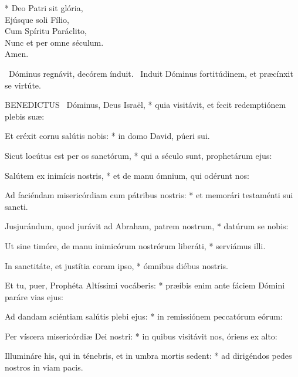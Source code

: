 * Deo Patri sit glória,\\
Ejúsque soli Fílio,\\
Cum Spíritu Paráclito,\\
Nunc et per omne séculum.\\
Amen.

\V\ Dóminus regnávit, decórem índuit. \R\ Induit Dóminus fortitúdinem, et præcínxit se virtúte.



\lettrine[lines=2]{B}{ENEDICTUS} \textdagger\ Dóminus, Deus Israël, * quia visitávit, et fecit redemptiónem plebis suæ:

Et eréxit cornu salútis nobis: * in domo David, púeri sui.

Sicut locútus est per os sanctórum, * qui a século sunt, prophetárum ejus:

Salútem ex inimícis nostris, * et de manu ómnium, qui odérunt nos:

Ad faciéndam misericórdiam cum pátribus nostris: * et memorári testaménti sui sancti.

Jusjurándum, quod jurávit ad Abraham, patrem nostrum, * datúrum se nobis:

Ut sine timóre, de manu inimicórum nostrórum liberáti, * serviámus illi.

In sanctitáte, et justítia coram ipso, * ómnibus diébus nostris.

Et tu, puer, Prophéta Altíssimi vocáberis: * præíbis enim ante fáciem Dómini paráre vias ejus:

Ad dandam sciéntiam salútis plebi ejus: * in remissiónem peccatórum eórum:

Per víscera misericórdiæ Dei nostri: * in quibus visitávit nos, óriens ex alto:

Illumináre his, qui in ténebris, et in umbra mortis sedent: * ad dirigéndos pedes nostros in viam pacis.




